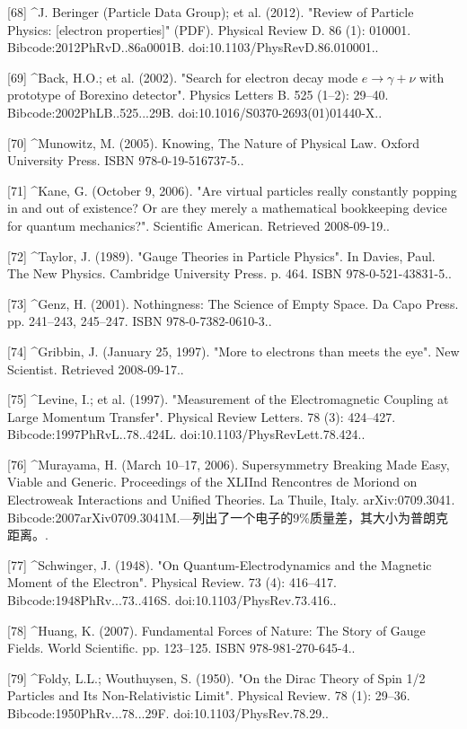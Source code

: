 [68]
^J. Beringer (Particle Data Group); et al. (2012). "Review of Particle Physics: [electron properties]" (PDF). Physical Review D. 86 (1): 010001. Bibcode:2012PhRvD..86a0001B. doi:10.1103/PhysRevD.86.010001..

[69]
^Back, H.O.; et al. (2002). "Search for electron decay mode $e \to \gamma + \nu$ with prototype of Borexino detector". Physics Letters B. 525 (1–2): 29–40. Bibcode:2002PhLB..525...29B. doi:10.1016/S0370-2693(01)01440-X..

[70]
^Munowitz, M. (2005). Knowing, The Nature of Physical Law. Oxford University Press. ISBN 978-0-19-516737-5..

[71]
^Kane, G. (October 9, 2006). "Are virtual particles really constantly popping in and out of existence? Or are they merely a mathematical bookkeeping device for quantum mechanics?". Scientific American. Retrieved 2008-09-19..

[72]
^Taylor, J. (1989). "Gauge Theories in Particle Physics". In Davies, Paul. The New Physics. Cambridge University Press. p. 464. ISBN 978-0-521-43831-5..

[73]
^Genz, H. (2001). Nothingness: The Science of Empty Space. Da Capo Press. pp. 241–243, 245–247. ISBN 978-0-7382-0610-3..

[74]
^Gribbin, J. (January 25, 1997). "More to electrons than meets the eye". New Scientist. Retrieved 2008-09-17..

[75]
^Levine, I.; et al. (1997). "Measurement of the Electromagnetic Coupling at Large Momentum Transfer". Physical Review Letters. 78 (3): 424–427. Bibcode:1997PhRvL..78..424L. doi:10.1103/PhysRevLett.78.424..

[76]
^Murayama, H. (March 10–17, 2006). Supersymmetry Breaking Made Easy, Viable and Generic. Proceedings of the XLIInd Rencontres de Moriond on Electroweak Interactions and Unified Theories. La Thuile, Italy. arXiv:0709.3041. Bibcode:2007arXiv0709.3041M.—列出了一个电子的9\%质量差，其大小为普朗克距离。.

[77]
^Schwinger, J. (1948). "On Quantum-Electrodynamics and the Magnetic Moment of the Electron". Physical Review. 73 (4): 416–417. Bibcode:1948PhRv...73..416S. doi:10.1103/PhysRev.73.416..

[78]
^Huang, K. (2007). Fundamental Forces of Nature: The Story of Gauge Fields. World Scientific. pp. 123–125. ISBN 978-981-270-645-4..

[79]
^Foldy, L.L.; Wouthuysen, S. (1950). "On the Dirac Theory of Spin 1/2 Particles and Its Non-Relativistic Limit". Physical Review. 78 (1): 29–36. Bibcode:1950PhRv...78...29F. doi:10.1103/PhysRev.78.29..

